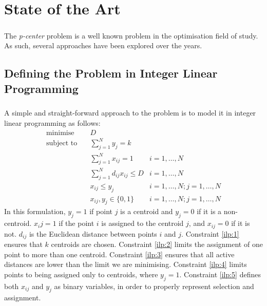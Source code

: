 \chapter{State of the Art}
\label{chap:sota}
\paragraph{}
The \emph{p-center} problem is a well known problem in the optimisation field of study. As such, several approaches have been explored over the years. 

\section{Defining the Problem in Integer Linear Programming}
\label{alg:ilp}
\paragraph{}
A simple and straight-forward approach to the problem is to model it in  integer linear programming as follows:
\begin{align}
\text{minimise}   \quad& D							   &\\
\text{subject to} \quad
& \sum\limits_{j=1}^{N}{y_j} = k 
& 							\label{ilp:1}\\
& \sum\limits_{j=1}^{N}{x_{ij}}	= 1   
& i=1,\ldots,N 				\label{ilp:2}\\
& \sum\limits_{j=1}^{N}{d_{ij} x_{ij}} \leq D
& i=1,\ldots,N				\label{ilp:3}\\
& x_{ij} \leq y_{j}				   
& i=1,\ldots,N;j=1,\ldots,N	\label{ilp:4}\\
& x_{ij},y_{j} \in \{0,1\}
& i=1,\ldots,N;j=1,\ldots,N \label{ilp:5}
\end{align}
In this formulation, $y_j = 1$ if point $j$ is a centroid and $y_j = 0$ if it is a non-centroid.
$x_ij = 1$ if the point $i$ is assigned to the centroid $j$, and $x_{ij}=0$ if it is not.
$d_{ij}$ is the Euclidean distance between points $i$ and $j$.
Constraint \ref{ilp:1} ensures that $k$ centroids are chosen.
Constraint \ref{ilp:2} limits the assignment of one point to more than one centroid.
Constraint \ref{ilp:3} ensures that all active distances are lower than the limit we are minimising.
Constraint \ref{ilp:4} limits points to being assigned only to centroids, where $y_j=1$.
Constraint \ref{ilp:5} defines both $x_{ij}$ and $y_j$ as binary variables, in order to properly represent selection and assignment.
